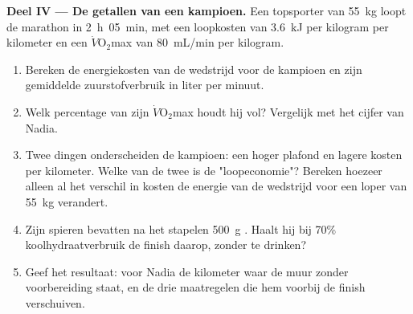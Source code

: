 \begin{problem}
\medskip
\noindent\textbf{Deel IV --- De getallen van een kampioen.}
Een topsporter van \qty{55}{kg} loopt de marathon in \qty{2}{h}\,
\qty{05}{min}, met een loopkosten van \qty{3.6}{kJ} per kilogram per
kilometer en een $\dot V\!\mathrm{O_2}$max van \qty{80}{mL/min} per
kilogram.
\begin{enumerate}[resume]
  \item Bereken de energiekosten van de wedstrijd voor de kampioen en
        zijn gemiddelde zuurstofverbruik in liter per minuut.
  \item Welk percentage van zijn $\dot V\!\mathrm{O_2}$max houdt hij vol?
        Vergelijk met het cijfer van Nadia.
  \item Twee dingen onderscheiden de kampioen: een hoger plafond en
        lagere kosten per kilometer. Welke van de twee is de
        "loopeconomie"? Bereken hoezeer alleen al het verschil in kosten
        de energie van de wedstrijd voor een loper van \qty{55}{kg}
        verandert.
  \item Zijn spieren bevatten na het stapelen \qty{500}{g} .
        Haalt hij bij 70\% koolhydraatverbruik de finish daarop, zonder
        te drinken?
  \item Geef het resultaat: voor Nadia de kilometer waar de muur zonder
        voorbereiding staat, en de drie maatregelen die hem voorbij de
        finish verschuiven.
\end{enumerate}
\end{problem}
